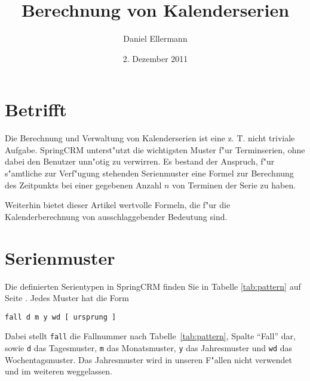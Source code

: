 \documentclass[a4paper]{article}
\title{Berechnung von Kalenderserien}
\author{Daniel Ellermann}
\date{2. Dezember 2011}
\numberwithin{equation}{section}
\begin{document}
\maketitle
\tableofcontents



%
%
%
%
\section{Betrifft}
Die Berechnung und Verwaltung von Kalenderserien ist eine z. T. nicht triviale
Aufgabe. SpringCRM unterst"utzt die wichtigsten Muster f"ur Terminserien, ohne
dabei den Benutzer unn"otig zu verwirren. Es bestand der Anspruch, f"ur
s"amtliche zur Verf"ugung stehenden Serienmuster eine Formel zur Berechnung
des Zeitpunkts bei einer gegebenen Anzahl $n$ von Terminen der Serie zu haben.

Weiterhin bietet dieser Artikel wertvolle Formeln, die f"ur die
Kalenderberechnung von ausschlaggebender Bedeutung sind.



%
%
%
%
\section{Serienmuster}
Die definierten Serientypen in SpringCRM finden Sie in Tabelle
\ref{tab:pattern} auf Seite \pageref{tab:pattern}. Jedes Muster hat die Form

\vspace{8pt}
\texttt{fall d m y wd [ ursprung ]}
\vspace{8pt}

\noindent Dabei stellt \texttt{fall} die Fallnummer nach
Tabelle~\ref{tab:pattern}, Spalte "`Fall"' dar, sowie \texttt{d} das
Tagesmuster, \texttt{m} das Monatsmuster, \texttt{y} das Jahresmuster und
\texttt{wd} das Wochentagsmuster. Das Jahresmuster wird in unseren F"allen nicht
verwendet und im weiteren weggelassen.
\end{document}
